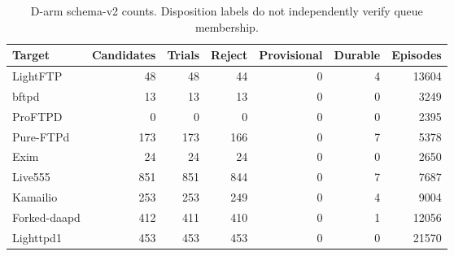 \begin{table}[!tbp]
\centering\small
\caption{D-arm schema-v2 counts. Disposition labels do not independently verify queue membership.}
\label{tab:observed_log_counts}
\begin{tabular}{lrrrrrr}
\toprule
Target & Candidates & Trials & Reject & Provisional & Durable & Episodes \\
\midrule
LightFTP & 48 & 48 & 44 & 0 & 4 & 13604 \\
bftpd & 13 & 13 & 13 & 0 & 0 & 3249 \\
ProFTPD & 0 & 0 & 0 & 0 & 0 & 2395 \\
Pure-FTPd & 173 & 173 & 166 & 0 & 7 & 5378 \\
Exim & 24 & 24 & 24 & 0 & 0 & 2650 \\
Live555 & 851 & 851 & 844 & 0 & 7 & 7687 \\
Kamailio & 253 & 253 & 249 & 0 & 4 & 9004 \\
Forked-daapd & 412 & 411 & 410 & 0 & 1 & 12056 \\
Lighttpd1 & 453 & 453 & 453 & 0 & 0 & 21570 \\
\bottomrule
\end{tabular}
\end{table}
